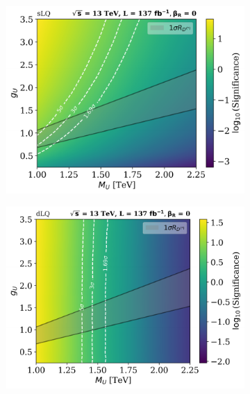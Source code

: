 \begin{figure}[]
    \centering
        \begin{subfigure}[b]{.48\linewidth}
            \includegraphics[width=\linewidth]{Images/Significance/Significance_Heatmap_13TeV_L137_sLQ_combined_woRHC.pdf}
        \end{subfigure}
        \begin{subfigure}[b]{.48\linewidth}
            \includegraphics[width=\linewidth]{Images/Significance/Significance_Heatmap_13TeV_L137_dLQ_combined_woRHC.pdf}
        \end{subfigure}     
        \begin{subfigure}[b]{.48\linewidth}

\end{subfigure}
\end{figure}

